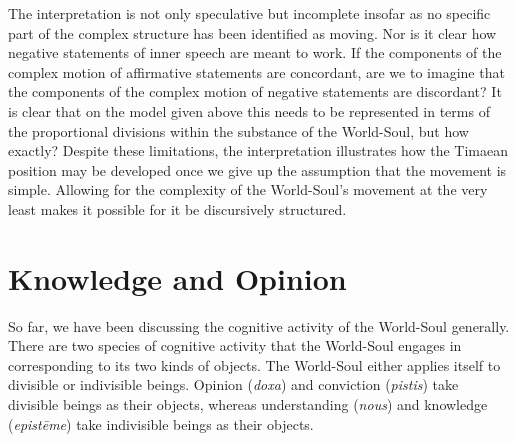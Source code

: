The interpretation is not only speculative but incomplete insofar as no specific part of the complex structure has been identified as moving. Nor is it clear how negative statements of inner speech are meant to work. If the components of the complex motion of affirmative statements are concordant, are we to imagine that the components of the complex motion of negative statements are discordant? It is clear that on the model given above this needs to be represented in terms of the proportional divisions within the substance of the World-Soul, but how exactly? Despite these limitations, the interpretation illustrates how the Timaean position may be developed once we give up the assumption that the movement is simple. Allowing for the complexity of the World-Soul's movement at the very least makes it possible for it be discursively structured.


\section{Knowledge and Opinion} %
\label{sec:knowledge_and_opinion}

So far, we have been discussing the cognitive activity of the World-Soul generally. There are two species of cognitive activity that the World-Soul engages in corresponding to its two kinds of objects. The World-Soul either applies itself to divisible or indivisible beings. Opinion (\emph{doxa}) and conviction (\emph{pistis}) take divisible beings as their objects, whereas understanding (\emph{nous}) and knowledge (\emph{epistēme}) take indivisible beings as their objects. 

